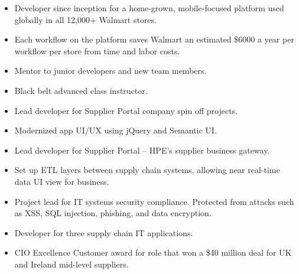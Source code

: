\documentclass[10pt,a4paper]{resume}
\begin{document}
\begin{itemize}
\item Developer since inception for a home-grown, mobile-focused platform used globally in all 12,000+ Walmart stores.
\item Each workflow on the platform saves Walmart an estimated \$6000 a year per workflow per store from time and labor costs.
\item Mentor to junior developers and new team members.
\end{itemize}

\divider

\begin{itemize}
\item Black belt advanced class instructor.
\end{itemize}

\divider

\begin{itemize}
\item Lead developer for Supplier Portal company spin off projects.
\item Modernized app UI/UX using jQuery and Semantic UI.
\end{itemize}

\divider

\begin{itemize}
\item Lead developer for Supplier Portal -- HPE's supplier business gateway.
\item Set up ETL layers between supply chain systems, allowing near real-time data UI view for business.
\item Project lead for IT systems security compliance. Protected from attacks such as XSS, SQL injection, phishing, and data encryption.
\end{itemize}

\divider

\begin{itemize}
\item Developer for three supply chain IT applications.
\item CIO Excellence Customer award for role that won a \$40 million deal for UK and Ireland mid-level suppliers.

\end{itemize}


\clearpage

\end{document}
